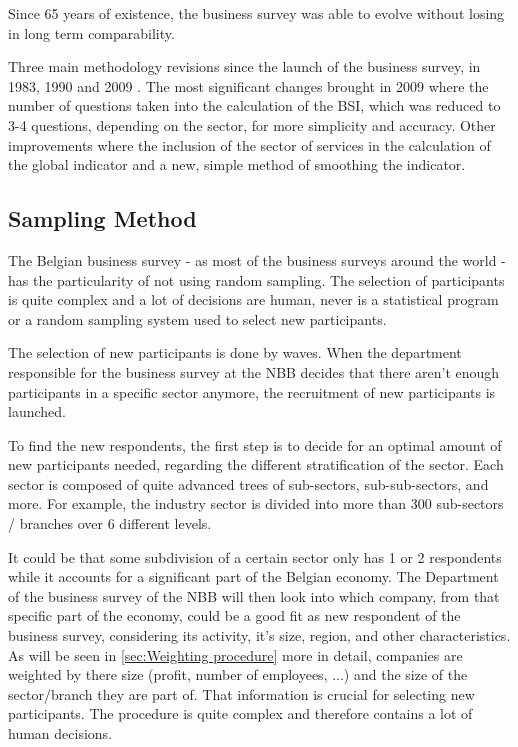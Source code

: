\documentclass[12pt,a4paper,oneside]{book}
\begin{document}
Since 65 years of existence, the business survey was able to evolve without losing in long term comparability.

Three main methodology revisions since the launch of the business survey, in 1983, 1990 and 2009 \cite{de_greef_national_2009}.
The most significant changes brought in 2009 where the number of questions taken into the calculation of the BSI, which was reduced to 3-4 questions, depending on the sector, for more simplicity and accuracy.
Other improvements where the inclusion of the sector of services in the calculation of the global indicator and a new, simple method of smoothing the indicator.

\subsection{Sampling Method}
\label{sec:Recruitment of participants}

The Belgian business survey - as most of the business surveys around the world - has the particularity of not using random sampling. 
The selection of participants is quite complex and a lot of decisions are human, never is a statistical program or a random sampling system used to select new participants.


The selection of new participants is done by waves. When the department responsible for the business survey at the NBB decides that there aren't enough participants in a specific sector anymore, the recruitment of new participants is launched.

To find the new respondents, the first step is to decide for an optimal amount of new participants needed, regarding the different stratification of the sector.
Each sector is composed of quite advanced trees of sub-sectors, sub-sub-sectors,  and more. For example, the industry sector is divided into more than 300 sub-sectors / branches over 6 different levels. 

It could be that some subdivision of a certain sector only has 1 or 2 respondents while it accounts for a significant part of the Belgian economy. The Department of the business survey of the NBB will then look into which company, from that specific part of the economy, could be a good fit as new respondent of the business survey, considering its activity, it's size, region, and other characteristics.
As will be seen in \autoref{sec:Weighting procedure} more in detail, companies are weighted by there size (profit, number of employees, ...) and the size of the sector/branch they are part of. That information is crucial for selecting new participants.
The procedure is quite complex and therefore contains a lot of human decisions.
 
\end{document}
